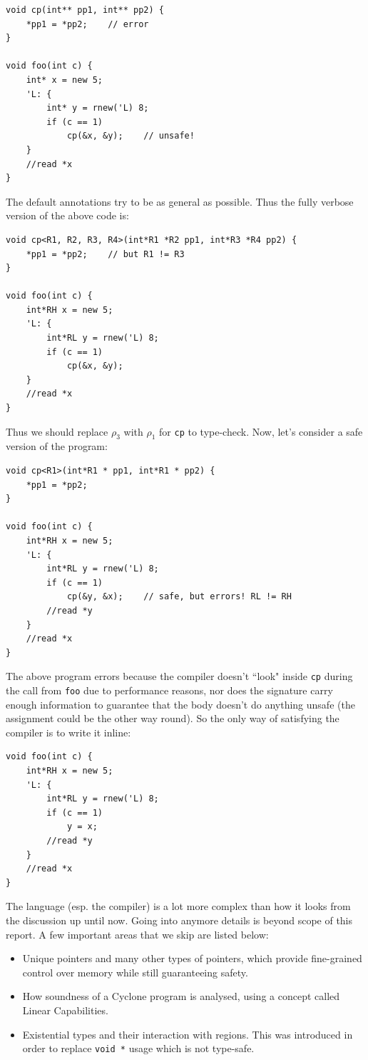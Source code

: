 \documentclass[11pt]{report}
\begin{document}
\begin{lstlisting}
void cp(int** pp1, int** pp2) {
    *pp1 = *pp2;    // error
}

void foo(int c) {
    int* x = new 5;
    'L: {
        int* y = rnew('L) 8;
        if (c == 1)
            cp(&x, &y);    // unsafe!
    }
    //read *x
}
\end{lstlisting}

The default annotations try to be as general as possible. Thus the fully verbose version of the above code is:

\begin{lstlisting}
void cp<R1, R2, R3, R4>(int*R1 *R2 pp1, int*R3 *R4 pp2) {
    *pp1 = *pp2;    // but R1 != R3
}

void foo(int c) {
    int*RH x = new 5;
    'L: {
        int*RL y = rnew('L) 8;
        if (c == 1)
            cp(&x, &y);
    }
    //read *x
}
\end{lstlisting}

Thus we should replace $\rho_3$ with $\rho_1$ for \texttt{cp} to type-check. Now, let's consider a safe version of the program:

\begin{lstlisting}
void cp<R1>(int*R1 * pp1, int*R1 * pp2) {
    *pp1 = *pp2;
}

void foo(int c) {
    int*RH x = new 5;
    'L: {
        int*RL y = rnew('L) 8;
        if (c == 1)
            cp(&y, &x);    // safe, but errors! RL != RH
        //read *y
    }
    //read *x
}
\end{lstlisting}

The above program errors because the compiler doesn't ``look" inside \texttt{cp} during the call from \texttt{foo} due to performance reasons, nor does the signature carry enough information to guarantee that the body doesn't do anything unsafe (the assignment could be the other way round). So the only way of satisfying the compiler is to write it inline:

\begin{lstlisting}
void foo(int c) {
    int*RH x = new 5;
    'L: {
        int*RL y = rnew('L) 8;
        if (c == 1)
            y = x;
        //read *y
    }
    //read *x
}
\end{lstlisting}

The language (esp. the compiler) is a lot more complex than how it looks from the discussion up until now. Going into anymore details is beyond scope of this report. A few important areas that we skip are listed below:
\begin{itemize}
\item Unique pointers and many other types of pointers, which provide fine-grained control over memory while still guaranteeing safety.
\item How soundness of a Cyclone program is analysed, using a concept called Linear Capabilities\cite{linearregions}.
\item Existential types and their interaction with regions. This was introduced in order to replace \texttt{void\,*} usage which is not type-safe.
\end{itemize}
\end{document}
